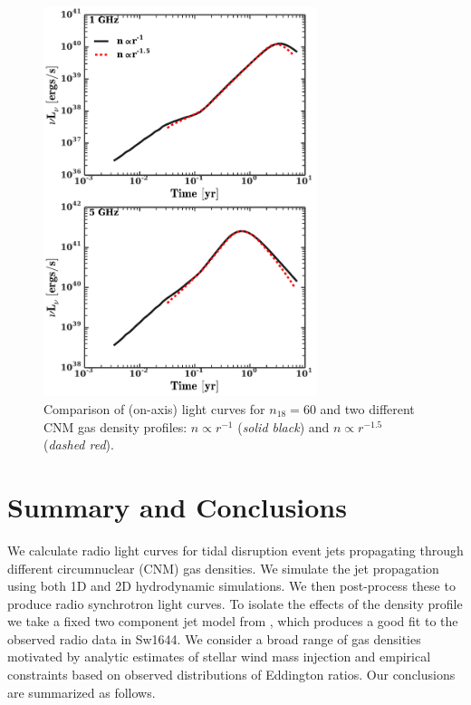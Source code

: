 \documentclass[usenatbib,fleqn]{mnras}
\begin{document}
\begin{figure} 
  \includegraphics[width=8cm]{profs2.pdf}
  \caption{\label{fig:profs2} Comparison of (on-axis) light curves for
    $n_{18}=60$ and two different CNM gas density profiles: $n\propto
    r^{-1}$ ({\it solid black}) and $n\propto r^{-1.5}$ ({\it dashed
      red}).}
\end{figure}



\section{Summary and Conclusions}
\label{sec:conc}

We calculate radio light curves for tidal disruption event jets
propagating through different circumnuclear (CNM) gas densities. We
simulate the jet propagation using both 1D and 2D hydrodynamic
simulations. We then post-process these to produce radio synchrotron
light curves. To isolate the effects of the density profile we take a
fixed two component jet model from \citet{Mimica+2015}, which produces
a good fit to the observed radio data in Sw1644. We
consider a broad range of gas densities motivated by analytic
estimates of stellar wind mass injection and empirical constraints
based on observed distributions of Eddington ratios. Our conclusions
are summarized as follows.
\end{document}
